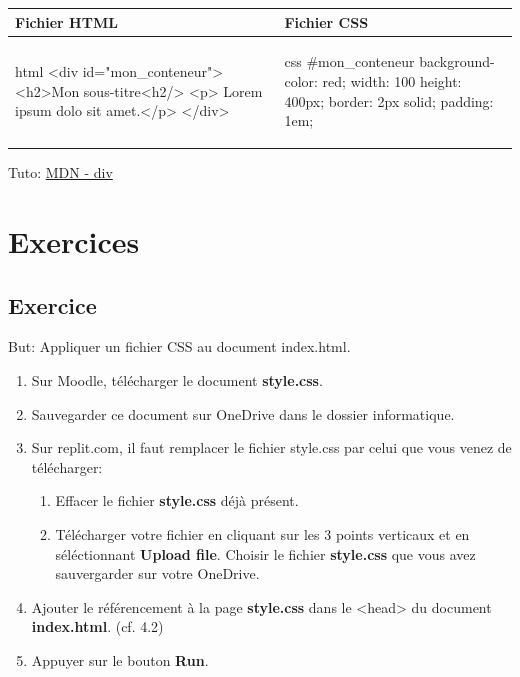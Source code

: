 \documentclass[a4paper,11pt]{article}
\begin{document}
\begin{tabular}{|l|l|}
\hline
\centering Fichier HTML & Fichier CSS\tabularnewline
\hline
\begin{minipage}{1\textwidth}
\begin{code}{html}
<div id="mon_conteneur">
  <h2>Mon sous-titre<h2/>
  <p> Lorem ipsum dolo sit amet.</p>
</div>
\end{code}
\end{minipage}&
\begin{minipage}{1\textwidth}
\begin{code}{css}
#mon_conteneur{
  background-color: red;
  width: 100%
  height: 400px;
  border: 2px solid;
  padding: 1em;
}
\end{code}
\end{minipage}\tabularnewline
\hline
\end{tabular}\par

Tuto: \href{https://developer.mozilla.org/fr/docs/Web/HTML/Element/div}{MDN - div}

\section{Exercices}
\subsection{Exercice}
But: Appliquer un fichier CSS au document index.html.
\begin{enumerate}
\item Sur Moodle, télécharger le document \textbf{style.css}.
\item Sauvegarder ce document sur OneDrive dans le dossier informatique.
\item Sur replit.com, il faut remplacer le fichier style.css par celui que vous venez de télécharger:
\begin{enumerate}
  \item Effacer le fichier \textbf{style.css} déjà présent.
  \item Télécharger votre fichier en cliquant sur les 3 points verticaux et en séléctionnant \textbf{Upload file}. Choisir le fichier \textbf{ style.css} que vous avez sauvergarder sur votre OneDrive.
\end{enumerate}
\item Ajouter le référencement à la page \textbf{style.css} dans le <head> du document \textbf{index.html}. (cf. 4.2)
\item Appuyer sur le bouton \textbf{Run}.
\end{enumerate}
\end{document}
